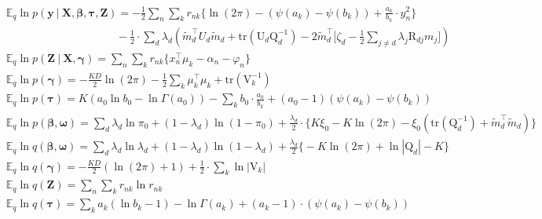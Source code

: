\documentclass[twoside,11pt]{article}
\newcommand\given[1][]{\:#1\vert\:}
\newcommand{\transpose}[1]{#1^{\intercal}}
\newcommand{\nsum}{\sum\limits_{n}}
\newcommand{\ksum}{\sum\limits_{k}}
\newcommand{\boldbeta}{\boldsymbol\beta}
\newcommand{\boldgamma}{\boldsymbol\gamma}
\newcommand{\boldomega}{\boldsymbol\omega}
\newcommand{\boldtau}{\boldsymbol\tau}
\newcommand{\E}{\mathbb{E}}
\newcommand{\qmat}{\mathrm{Q}}
\newcommand{\trace}[1]{\mathrm{tr} \left( #1 \right)}
\begin{document}
\begin{align*}
	& \E_q \ln p\left( \mathbf{y} \given \mathbf{X}, \boldbeta, \boldtau, \mathbf{Z} \right) = - \frac{1}{2} \nsum \ksum r_{nk} \Big\{  \ln(2\pi) - (\psi(a_k) - \psi(b_k)) + \frac{a_k}{b_k} \cdot y_n^2 \Big\} \\ & \qquad \qquad \qquad\qquad \qquad - \frac{1}{2} \cdot \sum_d \lambda_d \left( \transpose{\tilde{m}_d} U_d \tilde{m}_d + \trace{\mathrm{U}_d \mathrm{Q}_d^{-1}} - 2\transpose{\tilde{m}_d} \Bigg[ \zeta_d - \frac{1}{2} \sum_{j\neq d} \lambda_j \mathrm{R}_{dj} m_j\Bigg] \right)\\
	& \E_q \ln p\left( \mathbf{Z} \given \mathbf{X}, \boldgamma \right)  = \nsum \ksum r_{nk} \Big\{ \transpose{x_n} \mu_k - \alpha_n - \varphi_n \Big\}\\
	& \E_q \ln p\left( \boldgamma \right) = -\frac{KD}{2} \ln(2\pi) - \frac{1}{2} \ksum  \transpose{\mu_k} \mu_k + \trace{\mathrm{V}_k^{-1}}  \\
	& \E_q \ln p\left( \boldtau \right) = K \left( a_0 \ln b_0 - \ln \Gamma(a_0) \right) - \ksum b_0 \cdot \frac{a_k}{b_k} + (a_0 - 1) \left( \psi(a_k) - \psi(b_k) \right) \\
	& \E_q \ln p\left( \boldbeta, \boldomega \right) = \sum_d \lambda_d \ln \pi_0 + (1 - \lambda_d) \ln (1 - \pi_0) + \frac{\lambda_d}{2} \cdot \Big\{ K \xi_0 - K \ln (2 \pi) - \xi_0 \left( \trace{\qmat_d^{-1}} + \transpose{\tilde{m}_d}\tilde{m}_d \right) \Big\} \\
	& \E_q \ln q\left( \boldbeta, \boldomega \right) = \sum_d \lambda_d \ln \lambda_d + (1 - \lambda_d) \ln (1-\lambda_d) + \frac{\lambda_d}{2} \Big\{ - K \ln (2\pi) + \ln |\qmat_d| - K\Big\}\\
	& \E_q \ln q\left( \boldgamma \right) = - \frac{KD}{2} \left( \ln(2\pi) + 1 \right) + \frac{1}{2} \cdot \ksum \ln |\mathrm{V}_k| \\
	& \E_q \ln q\left( \mathbf{Z} \right) = \nsum \ksum r_{nk} \ln r_{nk} \\
	& \E_q \ln q\left( \mathbf{\tau} \right) = \ksum a_k \left( \ln b_k - 1 \right) - \ln \Gamma(a_k)  + (a_k - 1) \cdot \left( \psi(a_k) - \psi(b_k) \right)
\end{align*}








\end{document}
